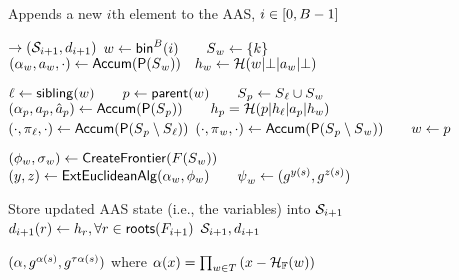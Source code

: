 \begin{algorithm}[H]%
    \caption{\small Appends a new $i$th element to the AAS, $i\in[0,B-1]$}
    \label{a:aas:append}
    \begin{algorithmic}[1]
     $\rightarrow (\mathcal{S}_{i+1}, d_{i+1})$
        \State $w \gets \mathsf{bin}^B(i) \qquad \textcolor{black}{S}_w \gets \{k\}$
        \label{a:aas:append:create-leaf-begin}
        \State $(\alpha_w, {\textcolor{black}{a}}_w, \cdot) \gets \mathsf{Accum}(\mathsf{P}(\textcolor{black}{S}_w)) \quad \textcolor{black}{h}_w \gets \mathcal{H}(w|\bot|{\textcolor{black}{a}}_w|\bot)$
        \label{a:aas:append:create-leaf-end}

        \label{a:aas:append:merge-begin}
            \State $\ell \gets\mathsf{sibling}(w) \qquad p\gets \mathsf{parent}(w) \qquad \textcolor{black}{S}_p \gets \textcolor{black}{S}_\ell\cup \textcolor{black}{S}_w$
            \State $(\alpha_p, {\textcolor{black}{a}}_p, \textcolor{black}{\hat{a}}_p) \gets \mathsf{Accum}(\mathsf{P}(\textcolor{black}{S}_p))\qquad \textcolor{black}{h}_p = \mathcal{H}(p|\textcolor{black}{h}_\ell|{\textcolor{black}{a}}_p|\textcolor{black}{h}_w)$
            \State $(\cdot, \textcolor{black}{\pi}_\ell, \cdot) \gets \mathsf{Accum}(\mathsf{P}(\textcolor{black}{S}_p\setminus \textcolor{black}{S}_\ell))$
            \State $(\cdot, \textcolor{black}{\pi}_w, \cdot) \gets \mathsf{Accum}(\mathsf{P}(\textcolor{black}{S}_p \setminus \textcolor{black}{S}_w)) \qquad w\gets p$
        \EndWhile
        \label{a:aas:append:merge-end}

        \label{a:aas:append:root-at-begin}
        \State $(\phi_w,\textcolor{black}{\sigma}_w) \gets \mathsf{CreateFrontier}(F(\textcolor{black}{S}_w))$
        \State $(y,z)\gets \mathsf{ExtEuclideanAlg}(\alpha_w, \phi_w)\qquad {\textcolor{black}{\psi}}_w \gets ( g^{y(s)}, g^{z(s)})$
        \label{a:aas:append:root-at-end}

        \State Store updated AAS state (i.e., the  variables) into $\mathcal{S}_{i+1}$
        \State $d_{i+1}(r) \gets \textcolor{black}{h}_r, \forall r \in \mathsf{roots}(F_{i+1})$
        \State \Return $\mathcal{S}_{i+1}, d_{i+1}$
    \EndFunction

        \State \Return $(\alpha, g^{\alpha(s)}, g^{\tau \alpha(s)})$ where $\alpha(x)=\prod_{w \in T} {(x-\mathcal{H}_{\mathbb{F}}(w))}$
    \EndFunction
    \end{algorithmic}
\end{algorithm}

